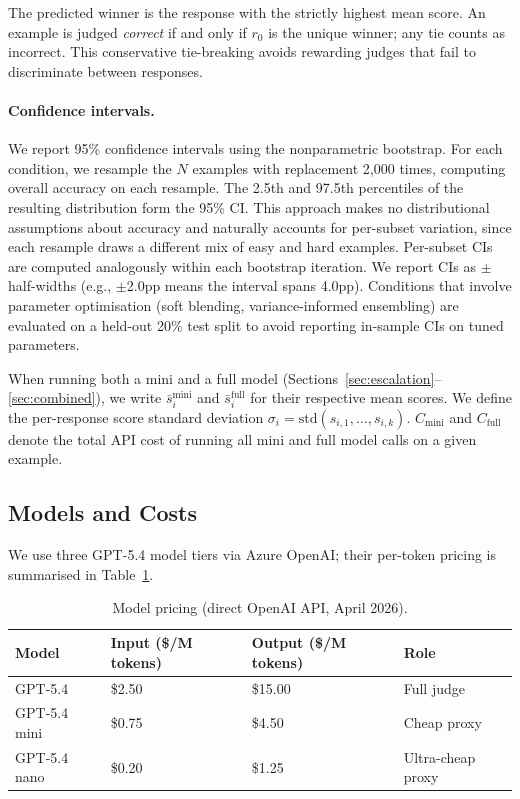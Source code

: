 \documentclass{article}
\begin{document}
The predicted winner is the response with the strictly highest mean score. An example is judged \emph{correct} if and only if $r_0$ is the unique winner; any tie counts as incorrect. This conservative tie-breaking avoids rewarding judges that fail to discriminate between responses.

\paragraph{Confidence intervals.} We report 95\% confidence intervals using the nonparametric bootstrap. For each condition, we resample the $N$ examples with replacement 2,000 times, computing overall accuracy on each resample. The 2.5th and 97.5th percentiles of the resulting distribution form the 95\% CI. This approach makes no distributional assumptions about accuracy and naturally accounts for per-subset variation, since each resample draws a different mix of easy and hard examples. Per-subset CIs are computed analogously within each bootstrap iteration. We report CIs as $\pm$ half-widths (e.g., $\pm$2.0pp means the interval spans 4.0pp). Conditions that involve parameter optimisation (soft blending, variance-informed ensembling) are evaluated on a held-out 20\% test split to avoid reporting in-sample CIs on tuned parameters.

When running both a mini and a full model (Sections~\ref{sec:escalation}--\ref{sec:combined}), we write $\bar{s}_i^{\text{mini}}$ and $\bar{s}_i^{\text{full}}$ for their respective mean scores. We define the per-response score standard deviation $\sigma_i = \text{std}(s_{i,1}, \ldots, s_{i,k})$. $C_{\text{mini}}$ and $C_{\text{full}}$ denote the total API cost of running all mini and full model calls on a given example.

\subsection{Models and Costs}
\label{sec:models}

We use three GPT-5.4 model tiers via Azure OpenAI; their per-token pricing is summarised in Table~\ref{tab:models}.

\begin{table}[ht]
\centering
\caption{Model pricing (direct OpenAI API, April 2026).}
\label{tab:models}
\begin{tabular}{llll}
\toprule
Model & Input (\$/M tokens) & Output (\$/M tokens) & Role \\
\midrule
GPT-5.4       & \$2.50 & \$15.00 & Full judge \\
GPT-5.4 mini  & \$0.75 & \$4.50  & Cheap proxy \\
GPT-5.4 nano  & \$0.20 & \$1.25  & Ultra-cheap proxy \\
\bottomrule
\end{tabular}
\end{table}
\end{document}
